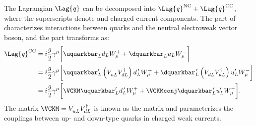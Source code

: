 The Lagrangian $\Lag{\it q}$ can be decomposed into
$\Lag{\it q}^\mathrm{NC}+\Lag{\it q}^\mathrm{CC}$, where the
superscripts denote \NC and charged current \CC components.
The \NC part of  characterizes interactions between quarks and the neutral electroweak
vector boson, and the \CC part transforms as:
\begin{align}
  \Lag{\it q}^\mathrm{CC}
  &= i\frac{g}{2}\gamma^\mu
  \bigg[\uquarkbar_Ld_LW^+_\mu + \dquarkbar_Lu_LW^-_\mu
  \bigg]  \nonumber\\
  &= i\frac{g}{2}\gamma^\mu
  \bigg[
    \uquarkbar_L^\prime\left(V_{uL}^{\phantom{\dagger}}V_{dL}^\dagger\right)d_L^{\,\prime} W^+_\mu +
    \dquarkbar_L^{\,\prime}\left(V_{dL}^{\phantom{\dagger}}V_{uL}^\dagger\right)u_L^\prime W^-_\mu
  \bigg]  \nonumber\\
  &= i\frac{g}{2}\gamma^\mu
  \bigg[
    \VCKM\uquarkbar_L^\prime d_L^{\,\prime} W^+_\mu +
    \VCKMconj\dquarkbar_L^{\,\prime} u_L^\prime W^-_\mu
  \bigg].
\end{align}
The matrix $\VCKM=V^{\phantom{\dagger}}_{uL}V_{dL}^\dagger$ is known as the \ckm
matrix and parameterizes the couplings between up- and down-type quarks in charged weak currents.



